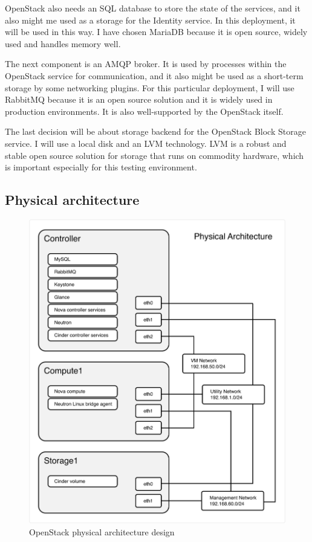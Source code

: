 OpenStack also needs an SQL database to store the state of the services, and it also might me used as a storage for the Identity service. In this deployment, it will be used in this way. I have chosen MariaDB because it is open source, widely used and handles memory well.

The next component is an AMQP broker. It is used by processes within the OpenStack service for communication, and it also might be used as a short-term storage by some networking plugins. For this particular deployment, I will use RabbitMQ because it is an open source solution and it is widely used in production environments. It is also well-supported by the OpenStack itself.

The last decision will be about storage backend for the OpenStack Block Storage service. I will use a local disk and an LVM technology. LVM is a robust and stable open source solution for storage that runs on commodity hardware, which is important especially for this testing environment.


\subsection{Physical architecture}

\begin{figure}[!h]
  \includegraphics[width=\textwidth]{fig/my_architecture.png}
  \caption{OpenStack physical architecture design}
  \label{fig:openstack_physical_arch}
\end{figure}

